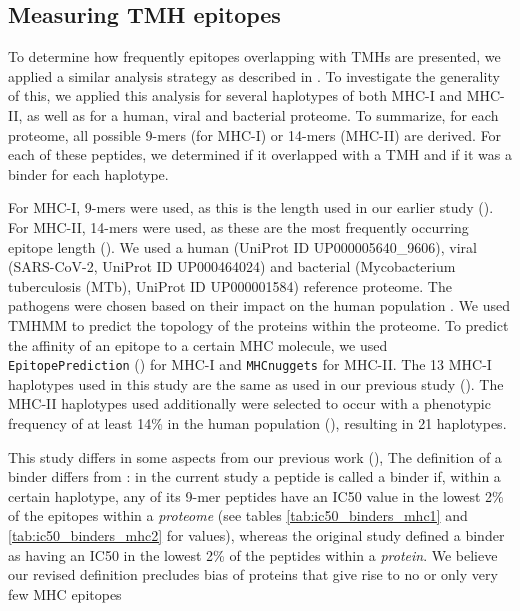 \subsection{Measuring TMH epitopes}

To determine how frequently epitopes overlapping with TMHs are presented,
we applied a similar analysis strategy as described in \cite{bianchi2017}.
To investigate the generality of this, we applied this analysis
for several haplotypes of both MHC-I and MHC-II, 
as well as for a human, viral and bacterial proteome.
To summarize, for each proteome, 
all possible 9-mers (for MHC-I) or 14-mers (MHC-II) are derived. 
For each of these peptides, we determined if it overlapped with a 
TMH and if it was a binder for each haplotype.

For MHC-I, 9-mers were used, as this is the length used in our earlier
study (\cite{bianchi2017}). For MHC-II, 14-mers were used, 
as these are the most frequently occurring
epitope length (\cite{bergseng2015different}).
We used a human (UniProt ID UP000005640\_9606), 
viral (SARS-CoV-2, UniProt ID UP000464024) 
and bacterial (Mycobacterium tuberculosis (MTb), UniProt ID UP000001584) 
reference proteome. The pathogens were chosen based 
on their impact on the human 
population .
We used TMHMM   to predict the topology 
of the proteins within the proteome.
To predict the affinity of an epitope to a certain MHC molecule,
we used \verb;EpitopePrediction; (\cite{bianchi2017}) for MHC-I 
and \verb;MHCnuggets;  for MHC-II.
The 13 MHC-I haplotypes used in this study are the same as 
used in our previous study (\cite{bianchi2017}).
The MHC-II haplotypes used additionally were selected 
to occur with a phenotypic frequency of at least 14\% in
the human population (\cite{greenbaum2011functional}),
resulting in 21 haplotypes.

This study differs in some aspects from our previous work (\cite{bianchi2017}), 
The definition of a binder differs from \cite{bianchi2017}:
in the current study a peptide is called a binder if, within a certain haplotype, 
any of its 9-mer peptides have an IC50 value in the lowest 2\% of 
the epitopes within a 
\emph{proteome} (see tables \ref{tab:ic50_binders_mhc1} and \ref{tab:ic50_binders_mhc2}
for values), whereas the original study defined
a binder as having an IC50 in the lowest 2\% 
of the peptides within a \emph{protein}.
We believe our revised definition precludes bias of proteins 
that give rise to no or only very few MHC epitopes

